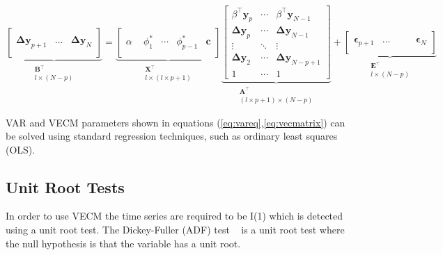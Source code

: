 \begin{equation} \label{eq:vecmatrix}
\underbrace{
               \begin{bmatrix}
               \quad\\
                \mathbf{\Delta y}_{p+1} & 
                \dots &
                \mathbf{\Delta y}_N \\
                \quad
               \end{bmatrix}
               }_{\substack{\mathbf{B}^\top\\ l \times (N-p) }} =
   \underbrace{
    \begin{bmatrix}
     \quad \\
     \alpha & \phi_1^* & \cdots & \phi_{p-1}^* & \mathbf{c} \\  
     \quad
     \end{bmatrix} 
     }_{\substack{ \mathbf{X}^\top\\ l \times (l\times p +1)}}
\underbrace{\begin{bmatrix} 
   \beta^\top \mathbf{y}_{p} & 
   \cdots & \beta^\top \mathbf{y}_{N-1} \\
   \mathbf{\Delta y}_p  & \cdots 
   & \mathbf{\Delta y}_{N-1} \\ 
   \vdots  & \ddots & \vdots \\
   \mathbf{\Delta y}_2  & \cdots 
   & \mathbf{\Delta y}_{N-p+1} \\
   1 & \cdots & 1 
   \end{bmatrix}}_{\substack{\mathbf{A}^\top \\ (l \times p +1) \times (N-p) }}
+
\underbrace{\begin{bmatrix}
              \quad \\
              \mathbf{\epsilon}_{p+1} &
              \dots &
              \quad &\mathbf{\epsilon}_N \\ \quad
             \end{bmatrix}}_{\substack{\mathbf{E}^\top\\ l \times (N-p) }} 
\end{equation}

VAR and VECM parameters shown in equations (\ref{eq:vareq},\ref{eq:vecmatrix}) can be solved
using standard regression techniques, such as ordinary least squares (OLS).

\subsection{Unit Root Tests}
In order to use VECM the time series are required to be I(1) which is detected
using a unit root test. The Dickey-Fuller (ADF) test ~\cite{dickey1979} is a
unit root test where the null hypothesis is that the
variable has a unit root.

